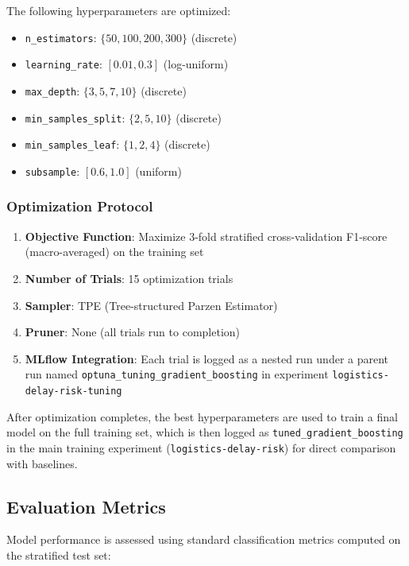 \documentclass[11pt,a4paper]{article}
\begin{document}
The following hyperparameters are optimized:
\begin{itemize}
    \item \texttt{n\_estimators}: $\{50, 100, 200, 300\}$ (discrete)
    \item \texttt{learning\_rate}: $[0.01, 0.3]$ (log-uniform)
    \item \texttt{max\_depth}: $\{3, 5, 7, 10\}$ (discrete)
    \item \texttt{min\_samples\_split}: $\{2, 5, 10\}$ (discrete)
    \item \texttt{min\_samples\_leaf}: $\{1, 2, 4\}$ (discrete)
    \item \texttt{subsample}: $[0.6, 1.0]$ (uniform)
\end{itemize}

\subsubsection{Optimization Protocol}

\begin{enumerate}
    \item \textbf{Objective Function}: Maximize 3-fold stratified cross-validation F1-score (macro-averaged) on the training set
    \item \textbf{Number of Trials}: 15 optimization trials
    \item \textbf{Sampler}: TPE (Tree-structured Parzen Estimator)
    \item \textbf{Pruner}: None (all trials run to completion)
    \item \textbf{MLflow Integration}: Each trial is logged as a nested run under a parent run named \texttt{optuna\_tuning\_gradient\_boosting} in experiment \texttt{logistics-delay-risk-tuning}
\end{enumerate}

After optimization completes, the best hyperparameters are used to train a final model on the full training set, which is then logged as \texttt{tuned\_gradient\_boosting} in the main training experiment (\texttt{logistics-delay-risk}) for direct comparison with baselines.

\subsection{Evaluation Metrics}

Model performance is assessed using standard classification metrics computed on the stratified test set:
\end{document}
